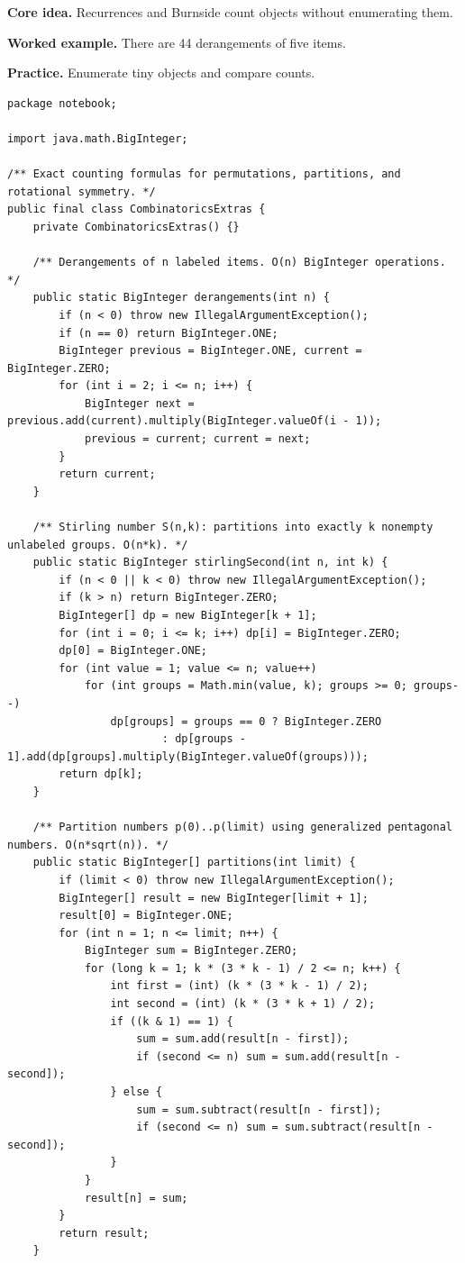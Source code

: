 \documentclass[10pt,letterpaper]{article}
\begin{document}
\noindent\textbf{Core idea.} Recurrences and Burnside count objects without enumerating them.\par
\noindent\textbf{Worked example.} There are 44 derangements of five items.\par
\noindent\textbf{Practice.} Enumerate tiny objects and compare counts.\par
\begin{lstlisting}
package notebook;

import java.math.BigInteger;

/** Exact counting formulas for permutations, partitions, and rotational symmetry. */
public final class CombinatoricsExtras {
    private CombinatoricsExtras() {}

    /** Derangements of n labeled items. O(n) BigInteger operations. */
    public static BigInteger derangements(int n) {
        if (n < 0) throw new IllegalArgumentException();
        if (n == 0) return BigInteger.ONE;
        BigInteger previous = BigInteger.ONE, current = BigInteger.ZERO;
        for (int i = 2; i <= n; i++) {
            BigInteger next = previous.add(current).multiply(BigInteger.valueOf(i - 1));
            previous = current; current = next;
        }
        return current;
    }

    /** Stirling number S(n,k): partitions into exactly k nonempty unlabeled groups. O(n*k). */
    public static BigInteger stirlingSecond(int n, int k) {
        if (n < 0 || k < 0) throw new IllegalArgumentException();
        if (k > n) return BigInteger.ZERO;
        BigInteger[] dp = new BigInteger[k + 1];
        for (int i = 0; i <= k; i++) dp[i] = BigInteger.ZERO;
        dp[0] = BigInteger.ONE;
        for (int value = 1; value <= n; value++)
            for (int groups = Math.min(value, k); groups >= 0; groups--)
                dp[groups] = groups == 0 ? BigInteger.ZERO
                        : dp[groups - 1].add(dp[groups].multiply(BigInteger.valueOf(groups)));
        return dp[k];
    }

    /** Partition numbers p(0)..p(limit) using generalized pentagonal numbers. O(n*sqrt(n)). */
    public static BigInteger[] partitions(int limit) {
        if (limit < 0) throw new IllegalArgumentException();
        BigInteger[] result = new BigInteger[limit + 1];
        result[0] = BigInteger.ONE;
        for (int n = 1; n <= limit; n++) {
            BigInteger sum = BigInteger.ZERO;
            for (long k = 1; k * (3 * k - 1) / 2 <= n; k++) {
                int first = (int) (k * (3 * k - 1) / 2);
                int second = (int) (k * (3 * k + 1) / 2);
                if ((k & 1) == 1) {
                    sum = sum.add(result[n - first]);
                    if (second <= n) sum = sum.add(result[n - second]);
                } else {
                    sum = sum.subtract(result[n - first]);
                    if (second <= n) sum = sum.subtract(result[n - second]);
                }
            }
            result[n] = sum;
        }
        return result;
    }


\end{lstlisting}
\end{document}
